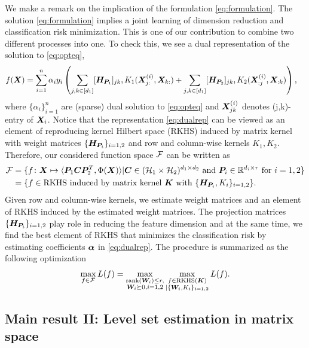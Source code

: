 \documentclass[mathptm]{statsoc}
\begin{document}
We make a remark on the implication of the formulation \eqref{eq:formulation}.
The solution \eqref{eq:formulation} implies a joint learning of dimension reduction and classification risk minimization. This is one of our contribution to combine two different processes into one. To check this, we see a dual representation of the solution to \eqref{eq:opteq},
\begin{align}\label{eq:dualrep}
f(\bm X) &= \sum_{i=1}^n\alpha_iy_i\left(\sum_{j,k\in[d_1]} [\bm{H}_{\bm{P}_1}]_{jk},K_1(\bm X^{(i)}_{j:},\bm X_{k:})+\sum_{j,k\in[d_1]} [\bm{H}_{\bm{P}_2}]_{jk},K_2(\bm X^{(i)}_{:j},\bm X_{:k})\right),
\end{align}
where $\{\alpha_i\}_{i=1}^n$ are  (sparse) dual solution to \eqref{eq:opteq} and $\bm X^{(i)}_{jk}$ denotes (j,k)-entry of $\bm X_i$. Notice that the representation  \eqref{eq:dualrep} can be viewed as an element of reproducing kernel Hilbert space (RKHS) induced by matrix kernel with weight matrices $\{\bm{H}_{\bm{P}_i}\}_{i=1,2}$ and row and column-wise kernels $K_1,K_2$.
Therefore, our considered function space $\mathcal{F}$ can be written as  
\begin{align}
    \mathcal{F} &= \{f\colon\bm X\mapsto\langle\bm{P}_1\bm C\bm{P}_2^T,\Phi(\bm X)\rangle|\bm C\in(\mathcal{H}_1\times \mathcal{H}_2)^{d_1\times d_2} \text{ and }\bm{P}_i \in\mathbb{R}^{d_i\times r} \text{ for } i=1,2\}\\
    &=\{f\in \text{RKHS induced by matrix kernel } \bm K \text{ with } \{\bm{H}_{\bm{P}_i},K_i\}_{i=1,2}\}.
\end{align}
Given row and column-wise kernels, we estimate weight matrices and an element of RKHS induced by the estimated weight matrices.
The projection matrices $\{\bm{H}_{\bm{P}_i}\}_{i=1,2}$ play role in reducing  the feature dimension and at the same time, we find the best element of RKHS that minimizes the classification risk by estimating coefficients $\bm\alpha$ in \eqref{eq:dualrep}. The procedure is summarized as the following optimization
\begin{align}
    \max_{f\in\mathcal{F}}L(f)  = \max_{\substack{\text{rank}(\bm{W}_i)\leq r,\\ \bm{W}_i\succeq 0,i = 1,2}}\max_{\substack{f\in\text{RKHS} (\bm K)\\ |\{\bm{W}_i,K_i\}_{i=1,2}}}L(f).
\end{align}


\subsection{Main result II: Level set estimation in matrix space}\label{subsec:pb2}
\end{document}
